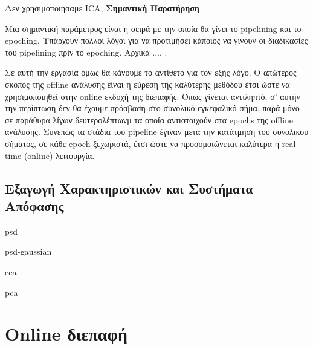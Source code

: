 \documentclass[11pt,a4paper,english,greek,twoside]{../Thesis}
\begin{document}
\par Δεν χρησιμοποιησαμε ICA, 
\textbf{Σημαντική Παρατήρηση}
\par Μια σημαντική παράμετρος είναι η σειρά με την οποία θα γίνει το pipelining και το epoching. Υπάρχουν πολλοί λόγοι για να προτιμήσει κάποιος να γίνουν οι διαδικασίες του pipelining πρίν το epoching. Αρχικά .... \cite{}.
\par Σε αυτή την εργασία όμως θα κάνουμε το αντίθετο για τον εξής λόγο. Ο απώτερος σκοπός της offline ανάλυσης είναι η εύρεση της καλύτερης μεθόδου έτσι ώστε να χρησιμοποιηθεί στην online εκδοχή της διεπαφής. Όπως γίνεται αντιληπτό, σ' αυτήν την περίπτωση δεν θα έχουμε πρόσβαση στο συνολικό εγκεφαλικό σήμα, παρά μόνο σε παράθυρα λίγων δευτερολέπτωνμ τα οποία αντιστοιχούν στα epochs της offline ανάλυσης. Συνεπώς τα στάδια του pipeline έγιναν μετά την κατάτμηση του συνολικού σήματος, σε κάθε epoch ξεχωριστά, έτσι ώστε να προσομοιώνεται καλύτερα η real-time (online) λειτουργία.

\subsection{Εξαγωγή Χαρακτηριστικών και Συστήματα Απόφασης}
\label{subsec:featureExtract}
\par psd
\par psd-gaussian
\par cca
\par pca

\section{Online διεπαφή}
\end{document}
